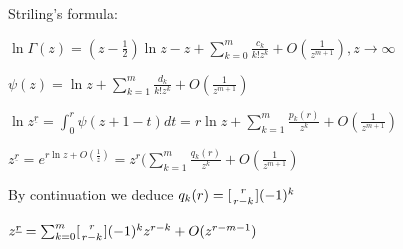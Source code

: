 \documentclass{article}
\begin{document}
Striling's formula:

\( \ln \Gamma(z) = (z-\frac{1}{2})\ln{z} - z + \sum_{k=0}^m \frac{c_k}{k! z^k} + O(\frac{1}{z^{m+1}}), z \to \infty \)

\( \psi(z) = \ln{z} + \sum_{k=1}^m \frac{d_k}{k! z^k} + O(\frac{1}{z^{m+1}}) \)

\( \ln z^{\underline{r}} = \int_0^r \psi(z+1-t)dt = r \ln z + \sum_{k=1}^m \frac{p_k(r)}{z^k} + O(\frac{1}{z^{m+1}}) \)

\( z^{\underline{r}} = e^{r \ln z + O(\frac{1}{z})} = z^r (\sum_{k=1}^m \frac{q_k(r)}{z^k} + O(\frac{1}{z^{m+1}}) \)

By continuation we deduce \( q_{k}(r) = [{r \atop {r-k}}](-1)^k \)

\( z^{\underline{r}} = \sum_{k=0}^m [{r \atop {r-k}}](-1)^k z^{r-k} + O(z^{r-m-1}) \)
\end{document}

